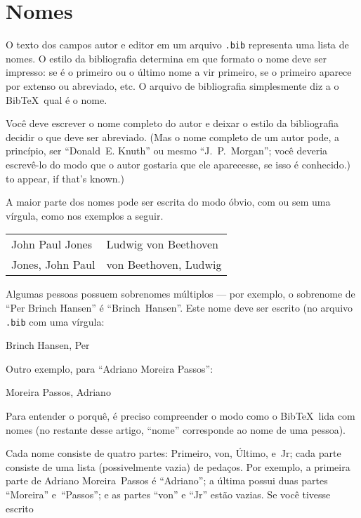 \documentclass[article,openany]{memoir}
\newcommand*{\extensao}[1]{\texttt{#1}}
\newenvironment{exemplo}{\begin{center}}{\end{center}}
\begin{document}
\chapter{Nomes}

O texto dos campos autor e editor em um arquivo \extensao{.bib}
representa uma lista de nomes. O estilo da bibliografia determina em
que formato o nome deve ser impresso: se é o primeiro ou o último nome
a vir primeiro, se o primeiro aparece por extenso ou abreviado, etc. O
arquivo de bibliografia simplesmente diz a o Bib\TeX\ qual é o nome.

Você deve escrever o nome completo do autor e deixar o estilo da
bibliografia decidir o que deve ser abreviado. (Mas o nome completo de
um autor pode, a princípio, ser ``Donald~E. Knuth'' ou mesmo
``J.~P.~Morgan''; você deveria escrevê-lo do modo que o autor gostaria
que ele aparecesse, se isso é conhecido.)  to appear, if that's
known.)

A maior parte dos nomes pode ser escrita do modo óbvio, com ou sem uma vírgula, como nos exemplos a seguir.

\smallskip

\begin{tabular}{p{5cm}l}
John Paul Jones  &  Ludwig von Beethoven \\
Jones, John Paul &  von Beethoven, Ludwig
\end{tabular}

\smallskip

Algumas pessoas possuem sobrenomes múltiplos --- por exemplo, o
sobrenome de ``Per Brinch Hansen'' é ``Brinch~Hansen''. Este nome deve
ser escrito (no arquivo \extensao{.bib} com uma vírgula:

\begin{exemplo}
Brinch Hansen, Per
\end{exemplo}

Outro exemplo, para ``Adriano Moreira Passos'':

\begin{exemplo}
Moreira Passos, Adriano
\end{exemplo}

Para entender o porquê, é preciso compreender o modo como o
Bib\TeX\ lida com nomes (no restante desse artigo, ``nome''
corresponde ao nome de uma pessoa).

Cada nome consiste de quatro partes: Primeiro, von, Último, e~Jr; cada
parte consiste de uma lista (possivelmente vazia) de pedaços.  Por
exemplo, a primeira parte de Adriano Moreira~Passos é ``Adriano''; a
última possui duas partes ``Moreira'' e~``Passos''; e as partes
``von'' e ``Jr'' estão vazias. Se você tivesse escrito
\end{document}
